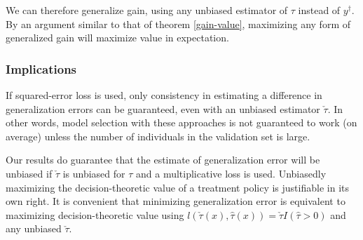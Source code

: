 We can therefore generalize gain, using any unbiased estimator of $\tau$ instead of $y^{\dagger}$. By an argument similar to that of theorem \ref{gain-value}, maximizing any form of generalized gain will maximize value in expectation.

\subsubsection{Implications}

If squared-error loss is used, only consistency in estimating a difference in generalization errors can be guaranteed, even with an unbiased estimator $\check\tau$. In other words, model selection with these approaches is not guaranteed to work (on average) unless the number of individuals in the validation set is large.

Our results do guarantee that the estimate of generalization error will be unbiased if $\check\tau$ is unbiased for $\tau$ and a multiplicative loss is used. Unbiasedly maximizing the decision-theoretic value of a treatment policy is justifiable in its own right. It is convenient that minimizing generalization error is equivalent to maximizing decision-theoretic value using $l(\check\tau(x), \hat\tau(x))  = \check\tau I(\hat\tau > 0)$ and any unbiased $\check\tau$.

